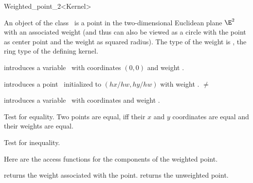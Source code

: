 \begin{ccRefClass} {Weighted_point_2<Kernel>}

\ccDefinition
An object of the class \ccRefName\ is a point in the two-dimensional
Euclidean plane $\E^2$ with an associated weight (and thus can also
be viewed as a circle with the point as center point and the weight
as squared radius).  The type of the weight is ,
the ring type of the defining kernel.

\ccInheritsFrom
{}

\ccTypes


\ccCreation
{}

            {introduces a variable \ccVar\ with  
             coordinates $(0,0)$ and weight .}

            {introduces a point \ccVar\ initialized to $(hx/hw,hy/hw)$ with 
             weight .
	     \ccPrecond {} $\neq$  }

            {introduces a variable \ccVar\ with  
             coordinates  and weight .}


\ccOperations

       {Test for equality. Two points are equal, iff their $x$ and $y$ 
        coordinates are equal and their weights are equal.}

       {Test for inequality.}

Here are the access functions for the components of the weighted point.

       {returns the weight associated with the point.}
\ccGlue
{}
       {returns the unweighted point.}

\ccExample


\end{ccRefClass}
